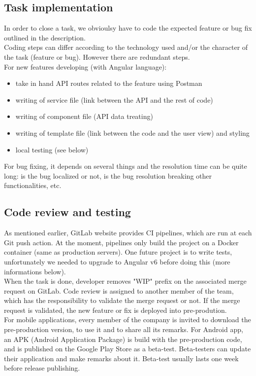 \documentclass{article}
\begin{document}
            \subsection{Task implementation}
                In order to close a task, we obvioulsy have to code the expected feature or bug fix outlined in the description.\\
                Coding steps can differ according to the technology used and/or the character of the task (feature or bug).
                However there are redundant steps.\\ For new features developing (with Angular language):
                \begin{itemize}
                    \item{take in hand API routes related to the feature using Postman}
                    \item{writing of service file (link between the API and the rest of code)}
                    \item{writing of component file (API data treating)}
                    \item{writing of template file (link between the code and the user view) and styling}
                    \item{local testing (see below)}
                \end{itemize}
                For bug fixing, it depends on several things and the resolution time can be quite long: is the bug localized or not,
                is the bug resolution breaking other functionalities, etc.
            \subsection{Code review and testing}
                As mentioned earlier, GitLab website provides CI pipelines, which are run at each Git push action. At the moment,
                pipelines only build the project on a Docker container (same as production servers). One future project is to
                write tests, unfortunately we needed to upgrade to Angular v6 before doing this (more informations below).\\
                When the task is done, developer removes "WIP" prefix on the associated merge request on GitLab. Code review is assigned
                to another member of the team, which has the responsibility to validate the merge request or not. If the merge request
                is validated, the new feature or fix is deployed into pre-prodution.\\
                For mobile applications, every member of the company is invited to download the pre-production version, to use it and to share
                all its remarks. For Android app, an APK (Android Application Package) is build with the pre-production code, and is published on the Google Play
                Store as a beta-test. Beta-testers can update their application and make remarks about it. Beta-test usually lasts one week
                before release publishing.
\end{document}
